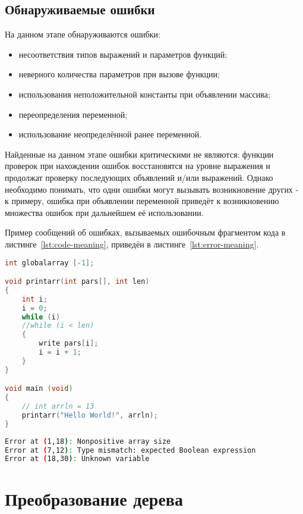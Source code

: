 \documentclass[a4paper,12pt]{report}
\numberwithin{equation}{section}
\begin{document}
\subsection{Обнаруживаемые ошибки}
На данном этапе обнаруживаются ошибки:

\begin{itemize}
  \item несоответствия типов выражений и параметров функций;
  \item неверного количества параметров при вызове функции;
  \item использования неположительной константы при объявлении массива;
  \item переопределения переменной;
  \item использование неопределённой ранее переменной.
\end{itemize}

Найденные на данном этапе ошибки критическими не являются: функции проверок при нахождении ошибок восстановятся на уровне выражения и продолжат проверку последующих объявлений и/или выражений.
Однако необходимо понимать, что одни ошибки могут вызывать возникновение других - к примеру, ошибка при объявлении переменной приведёт к возникновению множества ошибок при дальнейшем её использовании.

Пример сообщений об ошибках, вызываемых ошибочным фрагментом кода в листинге~\ref{lst:code-meaning}, приведён в листинге~\ref{lst:error-meaning}.

\begin{lstlisting}[language=C,caption={Ошибочный фрагмент кода},label=lst:code-meaning]
int globalarray [-1];

void printarr(int pars[], int len)
{
    int i;
    i = 0;
    while (i)
    //while (i < len)
    {
        write pars[i];
        i = i + 1;
    }
}

void main (void)
{   
    // int arrln = 13
    printarr("Hello World!", arrln);
}
\end{lstlisting}

\begin{lstlisting}[language=bash,caption={Сообщения о смысловых ошибках},label=lst:error-meaning]
Error at (1,18): Nonpositive array size
Error at (7,12): Type mismatch: expected Boolean expression
Error at (18,30): Unknown variable
\end{lstlisting}

\section{Преобразование дерева}
\end{document}
